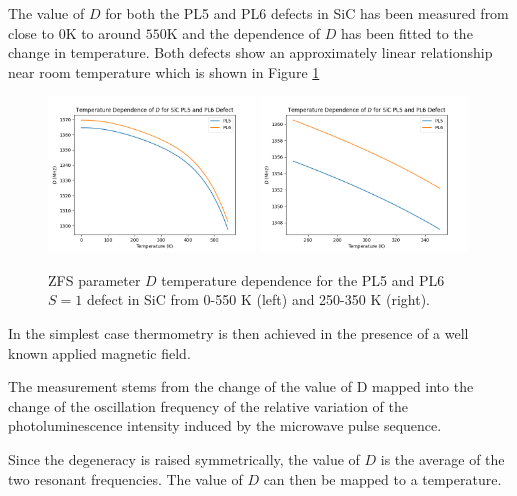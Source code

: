 The value of $D$ for both the PL5 and PL6 defects in SiC has been measured from close to $0$K to around $550$K and the dependence of $D$ has been fitted to the change in temperature. 
Both defects show an approximately linear relationship near room temperature which is shown in Figure \ref{fig:PL5PL6DvsT}
\begin{figure}[h]
    \begin{center}
    \includegraphics[width=0.49\textwidth]{figures/SiC-PL5PL6-D(T).png}
    \includegraphics[width=0.49\textwidth]{figures/SiC-PL5PL6-D(T)-close.png}
    \caption{ZFS parameter $D$ temperature dependence for the PL5 and PL6 $S=1$ defect in SiC from 0-550 K (left) and 250-350 K (right). }\label{fig:PL5PL6DvsT}
\end{center}
\end{figure}


In the simplest case thermometry is then achieved in the presence of a well known applied magnetic field. 

The measurement stems from the change of the value of
D mapped into the change of the oscillation frequency of the
relative variation of the photoluminescence intensity induced by the microwave pulse sequence.

Since the degeneracy is raised symmetrically, the value of $D$ is the average of the two resonant frequencies. The value of $D$ can then be mapped to a temperature. 

